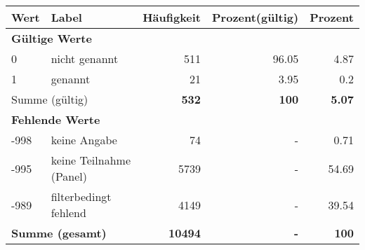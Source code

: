      \begin{longtable}{lXrrr}
     \toprule
     \textbf{Wert} & \textbf{Label} & \textbf{Häufigkeit} & \textbf{Prozent(gültig)} & \textbf{Prozent} \\
     \endhead
     \midrule
     \multicolumn{5}{l}{\textbf{Gültige Werte}}\\

     0 &
     \multicolumn{1}{X}{ nicht genannt   } &


       \num{511} &
       \num[round-mode=places,round-precision=2]{96,05} &
         \num[round-mode=places,round-precision=2]{4,87} \\

     1 &
     \multicolumn{1}{X}{ genannt   } &


       \num{21} &
       \num[round-mode=places,round-precision=2]{3,95} &
         \num[round-mode=places,round-precision=2]{0,2} \\
     \midrule
     \multicolumn{2}{l}{Summe (gültig)} &
       \textbf{\num{532}} &
     \textbf{100} &
       \textbf{\num[round-mode=places,round-precision=2]{5,07}} \\
     \multicolumn{5}{l}{\textbf{Fehlende Werte}}\\
       -998 &
       keine Angabe &
         \num{74} &
        - &
         \num[round-mode=places,round-precision=2]{0,71} \\
       -995 &
       keine Teilnahme (Panel) &
         \num{5739} &
        - &
         \num[round-mode=places,round-precision=2]{54,69} \\
       -989 &
       filterbedingt fehlend &
         \num{4149} &
        - &
         \num[round-mode=places,round-precision=2]{39,54} \\
     \midrule
     \multicolumn{2}{l}{\textbf{Summe (gesamt)}} &
          \textbf{\num{10494}} &
        \textbf{-} &
        \textbf{100} \\
     \bottomrule
     \end{longtable}
     
